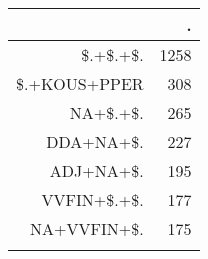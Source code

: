 \begin{tabular}{rr}
  \lsptoprule
 & . \\ 
  \midrule
\$.+\$.+\$. & 1258 \\ 
  \$.+KOUS+PPER & 308 \\ 
  NA+\$.+\$. & 265 \\ 
  DDA+NA+\$. & 227 \\ 
  ADJ+NA+\$. & 195 \\ 
  VVFIN+\$.+\$. & 177 \\ 
  NA+VVFIN+\$. & 175 \\ 
   \lspbottomrule
\end{tabular}

